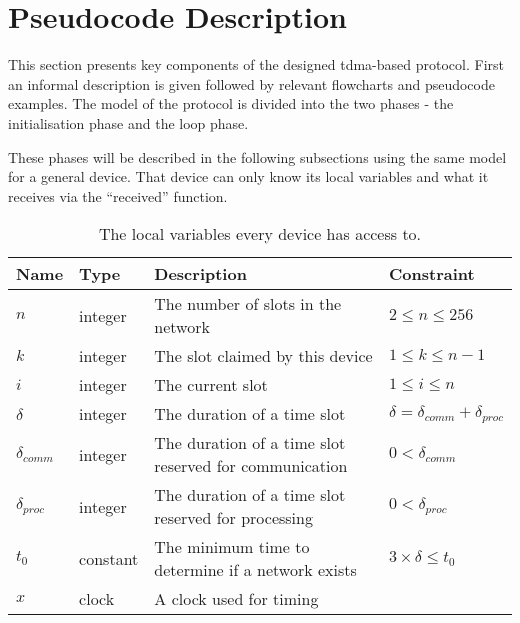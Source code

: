 \section{Pseudocode Description}\label{sec:Pseudo}
This section presents key components of the designed \gls{tdma}-based protocol. 
First an informal description is given followed by relevant flowcharts and pseudocode examples. 
The model of the protocol is divided into the two phases - the initialisation phase and the loop phase. 

These phases will be described in the following subsections using the same model for a general device. 
That device can only know its local variables and what it receives via the \enquote{received} function.

\begin{table}[H]
    \begin{tabularx}{\textwidth}{l|l|X|l}
        \toprule
        Name                & Type      & Description & Constraint \\
        \midrule
        $n$                 & integer   & The number of slots in the network                        & $2 \leq n \leq 256$\\
        $k$                 & integer   & The slot claimed by this device                           & $1 \leq k \leq n - 1$\\
        $i$                 & integer   & The current slot                                          & $1 \leq i \leq n$\\
        $\delta$            & integer   & The duration of a time slot                               & $\delta = \delta_{comm} + \delta_{proc}$\\
        $\delta_{comm}$     & integer   & The duration of a time slot reserved for communication    & $0 < \delta_{comm}$ \\
        $\delta_{proc}$     & integer   & The duration of a time slot reserved for processing       & $0 < \delta_{proc}$ \\
        $t_0$               & constant  & The minimum time to determine if a network exists         & $3 \times \delta \leq t_0$ \\
        $x$                 & clock     & A clock used for timing\\
        \bottomrule
    \end{tabularx}
    \caption{The local variables every device has access to.}
    \label{tab:locals}
\end{table}

